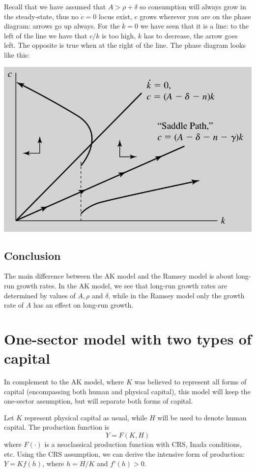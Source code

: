 \documentclass[12pt]{report}
\begin{document}
Recall that we have assumed that $A > \rho + \delta$ so consumption will always grow in the steady-state, thus no $\dot c =0$ locus exist, $c$ grows wherever you are on the phase diagram: arrows go up always. For the $\dot k = 0 $ we have seen that it is a line: to the left of the line we have that $c/k$ is too high, $k$ has to decrease, the arrow goes left. The opposite is true when at the right of the line. The phase diagram looks like this:\begin{center}
\includegraphics[scale=0.55]{images/akphase}
\end{center}

\subsection{Conclusion}

The main difference between the AK model and the Ramsey model is about long-run growth rates. In the AK model, we see that long-run growth rates are determined by values of $A, \rho$ and $\delta$, while in the Ramsey model only the growth rate of $A$ has an effect on long-run growth.

\section{One-sector model with two types of capital}

In complement to the AK model, where $K$ was believed to represent all forms of capital (encompassing both human and physical capital), this model will keep the one-sector assumption, but will separate both forms of capital.

Let $K$ represent physical capital as usual, while $H$ will be used to denote human capital. The production function is $$Y = F(K, H) $$ where $F(\cdot)$ is a neoclassical production function with CRS, Inada conditions, etc. Using the CRS assumption, we can derive the intensive form of production: $Y = K f(h)$, where $h = H/K$ and $f'(h) > 0$.
\end{document}
